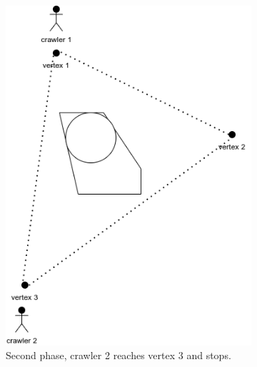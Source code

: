 \begin{figure}[h!]
\begin{subfigure}[t]{0.27\linewidth}
		\includegraphics[width=\linewidth]{graphics/triangle_3.png}
		\caption{Second phase, crawler 2 reaches vertex 3 and stops.}
		\label{fig:triangle_3}
	\end{subfigure}
	\hfill
	\begin{subfigure}[t]{0.27\linewidth}
		\centering

\end{subfigure}
\end{figure}
